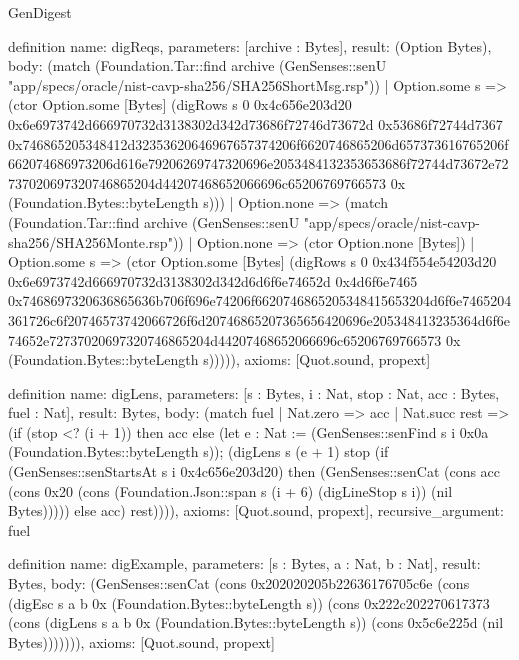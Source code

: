 \begin{lexlean}{GenDigest}
\begin{semanticmodule}
definition{
  name: digReqs,
  parameters: [archive : Bytes],
  result: (Option Bytes),
  body: (match (Foundation.Tar::find archive (GenSenses::senU "app/specs/oracle/nist-cavp-sha256/SHA256ShortMsg.rsp"))
    | Option.some s => (ctor Option.some [Bytes] (digRows s 0 0x4c656e203d20 0x6e6973742d666970732d3138302d342d73686f72746d73672d 0x53686f72744d7367 0x746865205348412d32353620646967657374206f6620746865206d657373616765206f662074686973206d616e79206269747320696e2053484132353653686f72744d73672e72737020697320746865204d44207468652066696c65206769766573 0x (Foundation.Bytes::byteLength s)))
    | Option.none => (match (Foundation.Tar::find archive (GenSenses::senU "app/specs/oracle/nist-cavp-sha256/SHA256Monte.rsp"))
      | Option.none => (ctor Option.none [Bytes])
      | Option.some s => (ctor Option.some [Bytes] (digRows s 0 0x434f554e54203d20 0x6e6973742d666970732d3138302d342d6d6f6e74652d 0x4d6f6e7465 0x7468697320636865636b706f696e74206f6620746865205348415653204d6f6e7465204361726c6f20746573742066726f6d20746865207365656420696e205348413235364d6f6e74652e72737020697320746865204d44207468652066696c65206769766573 0x (Foundation.Bytes::byteLength s))))),
  axioms: [Quot.sound, propext]
}

definition{
  name: digLens,
  parameters: [s : Bytes, i : Nat, stop : Nat, acc : Bytes, fuel : Nat],
  result: Bytes,
  body: (match fuel
    | Nat.zero => acc
    | Nat.succ rest => (if (stop <? (i + 1)) then acc else (let e : Nat := (GenSenses::senFind s i 0x0a (Foundation.Bytes::byteLength s)); (digLens s (e + 1) stop (if (GenSenses::senStartsAt s i 0x4c656e203d20) then (GenSenses::senCat (cons acc (cons 0x20 (cons (Foundation.Json::span s (i + 6) (digLineStop s i)) (nil Bytes))))) else acc) rest)))),
  axioms: [Quot.sound, propext],
  recursive_argument: fuel
}

definition{
  name: digExample,
  parameters: [s : Bytes, a : Nat, b : Nat],
  result: Bytes,
  body: (GenSenses::senCat (cons 0x202020205b22636176705c6e (cons (digEsc s a b 0x (Foundation.Bytes::byteLength s)) (cons 0x222c202270617373 (cons (digLens s a b 0x (Foundation.Bytes::byteLength s)) (cons 0x5c6e225d (nil Bytes))))))),
  axioms: [Quot.sound, propext]
}


\end{semanticmodule}
\end{lexlean}
